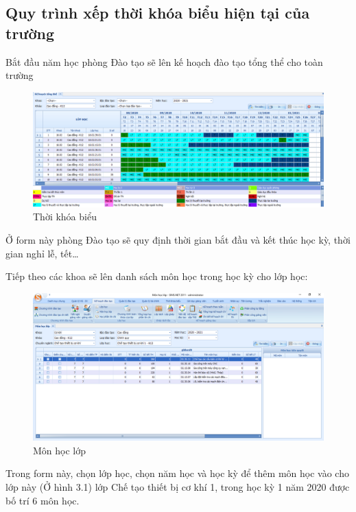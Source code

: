 \documentclass[11pt]{article}
\begin{document}
\subsection{\texorpdfstring{Quy trình xếp thời khóa biểu hiện tại của trường}{Current process}}
Bắt đầu năm học phòng Đào tạo sẽ lên kế hoạch đào tạo tổng thể cho toàn trường

\begin{figure}[h!]
\begin{center}
\includegraphics[width=17cm]{CurrentProcess1.png}
\caption{Thời khóa biểu}
\end{center}
\end{figure}

Ở form này phòng Đào tạo sẽ quy định thời gian bắt đầu và kết thúc học kỳ, thời gian nghỉ lễ, tết…

Tiếp theo các khoa sẽ lên danh sách môn học trong học kỳ cho lớp học:
\begin{figure}[h!]
\begin{center}
\includegraphics[width=17cm]{CurrentProcess2.png}
\caption{Môn học lớp}
\end{center}
\end{figure}

Trong form này, chọn lớp học, chọn năm học và học kỳ để thêm môn học vào cho lớp này (Ở hình 3.1) lớp Chế tạo thiết bị cơ khí 1, trong học kỳ 1 năm 2020 được bố trí 6 môn học.
\end{document}
